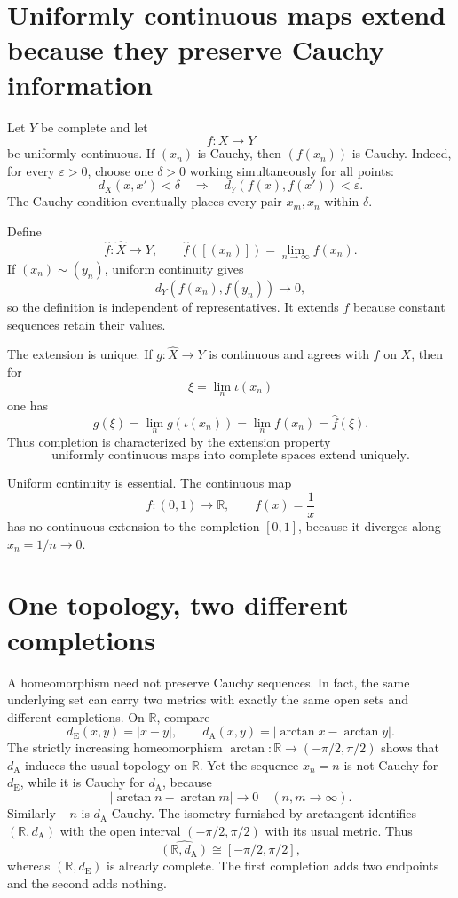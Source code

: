 \section{Uniformly continuous maps extend because they preserve Cauchy information}

Let \(Y\) be complete and let
\[
  f:X\to Y
\]
be uniformly continuous.  If \((x_n)\) is Cauchy, then \((f(x_n))\) is Cauchy.  Indeed, for every \(\varepsilon>0\), choose one \(\delta>0\) working simultaneously for all points:
\[
  d_X(x,x')<\delta
  \quad\Longrightarrow\quad
  d_Y(f(x),f(x'))<\varepsilon.
\]
The Cauchy condition eventually places every pair \(x_m,x_n\) within \(\delta\).

Define
\[
  \widehat f:\widehat X\to Y,
  \qquad
  \widehat f([(x_n)])
  =\lim_{n\to\infty}f(x_n).
\]
If \((x_n)\sim(y_n)\), uniform continuity gives
\[
  d_Y(f(x_n),f(y_n))\longrightarrow0,
\]
so the definition is independent of representatives.  It extends \(f\) because constant sequences retain their values.

The extension is unique.  If \(g:\widehat X\to Y\) is continuous and agrees with \(f\) on \(X\), then for
\[
  \xi=\lim_n\iota(x_n)
\]
one has
\[
  g(\xi)
  =\lim_ng(\iota(x_n))
  =\lim_nf(x_n)
  =\widehat f(\xi).
\]
Thus completion is characterized by the extension property
\[
  \boxed{
  \text{uniformly continuous maps into complete spaces extend uniquely}.}
\]

Uniform continuity is essential.  The continuous map
\[
  f:(0,1)\to\mathbb R,
  \qquad
  f(x)=\frac1x
\]
has no continuous extension to the completion \([0,1]\), because it diverges along \(x_n=1/n\to0\).

\section{One topology, two different completions}

A homeomorphism need not preserve Cauchy sequences. In fact, the same underlying set can carry two metrics with exactly the same open sets and different completions. On $\mathbb R$, compare
\[
 d_{\mathrm E}(x,y)=|x-y|,\qquad
 d_{\mathrm A}(x,y)=|\arctan x-\arctan y|.
\]
The strictly increasing homeomorphism $\arctan:\mathbb R\to(-\pi/2,\pi/2)$ shows that $d_{\mathrm A}$ induces the usual topology on $\mathbb R$. Yet the sequence $x_n=n$ is not Cauchy for $d_{\mathrm E}$, while it is Cauchy for $d_{\mathrm A}$, because
\[
 |\arctan n-\arctan m|\longrightarrow0
 \quad(n,m\to\infty).
\]
Similarly $-n$ is $d_{\mathrm A}$-Cauchy. The isometry furnished by arctangent identifies $(\mathbb R,d_{\mathrm A})$ with the open interval $(-\pi/2,\pi/2)$ with its usual metric. Thus
\[
 \widehat{(\mathbb R,d_{\mathrm A})}
 \cong[-\pi/2,\pi/2],
\]
whereas $(\mathbb R,d_{\mathrm E})$ is already complete. The first completion adds two endpoints and the second adds nothing.

